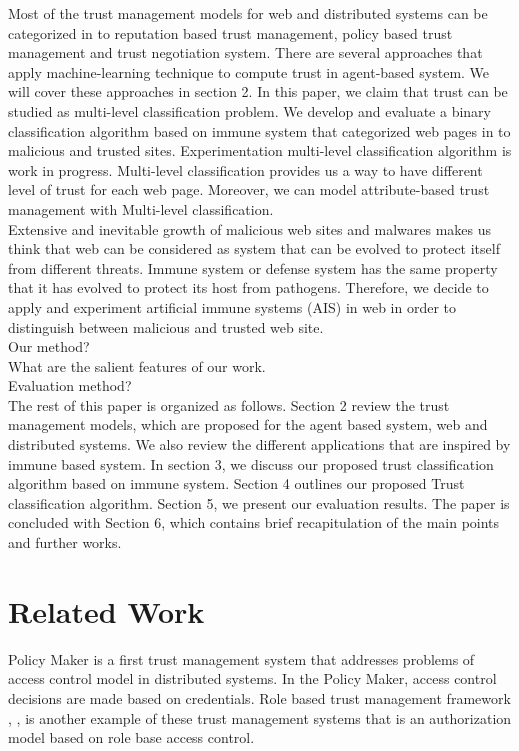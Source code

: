 \documentclass{llncs}
\begin{document}
Most of the trust management models for web and distributed systems can be categorized in to reputation based trust management, policy based trust management and trust negotiation system.  There are several approaches that apply machine-learning technique to compute trust in agent-based system.  We will cover these approaches in section 2. In this paper, we claim that trust can be studied as multi-level classification problem.  We develop and evaluate a binary classification algorithm based on immune system that categorized web pages in to malicious and trusted sites.  Experimentation multi-level classification algorithm is work in progress. Multi-level classification provides us a way to have different level of trust for each web page. Moreover, we can model attribute-based trust management \cite{mitchell} with Multi-level classification. \\

Extensive and inevitable growth of malicious web sites and malwares makes us think that web can be considered as system that can be evolved to protect itself from different threats.  Immune system or defense system has the same property that it has evolved to protect its host from pathogens. 
Therefore, we decide to apply and experiment artificial immune systems (AIS) \cite{AIS} in web in order to distinguish between malicious and trusted web site.\\ 

Our method?\\
What are the salient features of our work.\\
Evaluation method? \\


The rest of this paper is organized as follows. Section 2 review the trust management models, which are proposed for the agent based system, web and distributed systems.  We also review the different applications that are inspired by immune based system. In section 3, we discuss our proposed trust classification algorithm based on immune system.  Section 4 outlines our proposed Trust classification algorithm. Section 5, we present our evaluation results. The paper is concluded with Section 6, which contains brief recapitulation of the main points and further works.

\section{Related Work}
Policy Maker\cite{blaze} is a first trust management system that addresses problems of access control model in distributed systems.  In the Policy Maker, access control decisions are made based on credentials.  Role based trust management framework \cite{mitchell1}, \cite{mitchell}, \cite{mitchell3} is another example of these trust management systems that is an authorization model based on role base access control. \\
\end{document}
